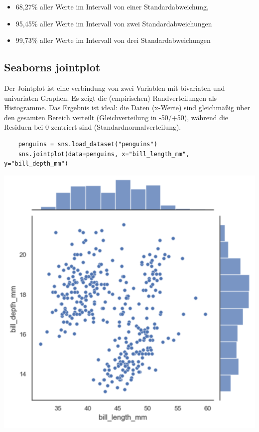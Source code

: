 \begin{itemize}
    \item 68,27\% aller Werte im Intervall von einer Standardabweichung,
    \item 95,45\% aller Werte im Intervall von zwei Standardabweichungen
    \item 99,73\% aller Werte im Intervall von drei Standardabweichungen
\end{itemize}

\subsection{Seaborns jointplot}

\begin{minipage}{0.5\linewidth}
Der Jointplot ist eine verbindung von zwei Variablen mit bivariaten und univariaten Graphen. Es zeigt die (empirischen) Randverteilungen als Histogramme. Das Ergebnis ist ideal: die Daten (x-Werte) sind gleichmäßig über den gesamten Bereich verteilt (Gleichverteilung in -50/+50), während die Residuen bei 0 zentriert sind (Standardnormalverteilung).
\begin{verbatim}
    penguins = sns.load_dataset("penguins")
    sns.jointplot(data=penguins, x="bill_length_mm", y="bill_depth_mm")
\end{verbatim}
\end{minipage}
\begin{minipage}{0.5\linewidth}
    \includegraphics[width=\linewidth]{./img/sns_jointplot.png}
\end{minipage}


